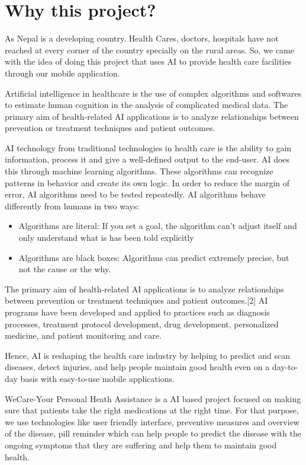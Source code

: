 \section{Why this project?}
As Nepal is a developing country. Health Cares, doctors, hospitals have not reached at every corner of the country specially on the rural areas. So, we came with the idea of doing this project that uses AI to provide health care facilities through our mobile application.\par  
Artificial intelligence in healthcare is the use of complex algorithms and softwares to estimate human cognition in the analysis of complicated medical data. The primary aim of health-related AI applications is to analyze relationships between prevention or treatment techniques and patient outcomes.\par
AI technology from traditional technologies in health care is the ability to gain information, process it and give a well-defined output to the end-user. AI does this through machine learning algorithms. These algorithms can recognize patterns in behavior and create its own logic. In order to reduce the margin of error, AI algorithms need to be tested repeatedly. AI algorithms behave differently from humans in two ways: 
\begin{itemize}
    \item Algorithms are literal: If you set a goal, the algorithm can't adjust itself and only understand what is has been told explicitly
    \item Algorithms are black boxes: Algorithms can predict extremely precise, but not the cause or the why.
\end{itemize}
The primary aim of health-related AI applications is to analyze relationships between prevention or treatment techniques and patient outcomes.[2] AI programs have been developed and applied to practices such as diagnosis processes, treatment protocol development, drug development, personalized medicine, and patient monitoring and care.\par
Hence, AI is reshaping the health care industry by helping to predict and scan diseases, detect injuries, and help people maintain good health even on a day-to-day basis with easy-to-use mobile applications.

WeCare-Your Personal Heath Assistance is a AI based project focused on making sure that patients take the right medications at the right time. For that purpose, we use technologies like user friendly interface, preventive measures and overview of the disease, pill reminder which can help people to predict the disease with the ongoing symptoms that they are suffering and help them to maintain good health.

